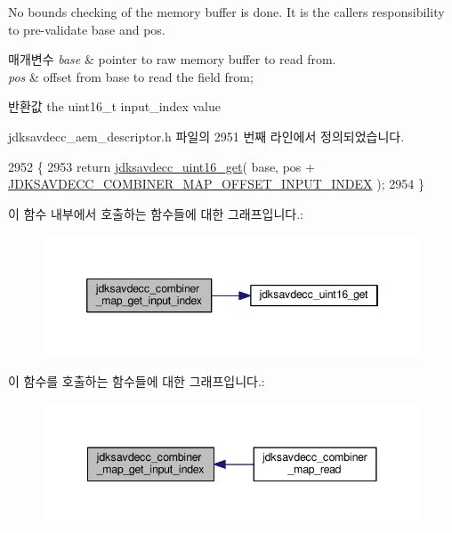 No bounds checking of the memory buffer is done. It is the caller\textquotesingle{}s responsibility to pre-\/validate base and pos.


\begin{DoxyParams}{매개변수}
{\em base} & pointer to raw memory buffer to read from. \\
\hline
{\em pos} & offset from base to read the field from; \\
\hline
\end{DoxyParams}
\begin{DoxyReturn}{반환값}
the uint16\+\_\+t input\+\_\+index value 
\end{DoxyReturn}


jdksavdecc\+\_\+aem\+\_\+descriptor.\+h 파일의 2951 번째 라인에서 정의되었습니다.


\begin{DoxyCode}
2952 \{
2953     \textcolor{keywordflow}{return} \hyperlink{group__endian_ga3fbbbc20be954aa61e039872965b0dc9}{jdksavdecc\_uint16\_get}( base, pos + 
      \hyperlink{group__combiner__map_gad2a9b9293252a0872808741240a44542}{JDKSAVDECC\_COMBINER\_MAP\_OFFSET\_INPUT\_INDEX} );
2954 \}
\end{DoxyCode}


이 함수 내부에서 호출하는 함수들에 대한 그래프입니다.\+:
\nopagebreak
\begin{figure}[H]
\begin{center}
\leavevmode
\includegraphics[width=346pt]{group__combiner__map_ga816da67b1dd4de7c120a82fda698721b_cgraph}
\end{center}
\end{figure}




이 함수를 호출하는 함수들에 대한 그래프입니다.\+:
\nopagebreak
\begin{figure}[H]
\begin{center}
\leavevmode
\includegraphics[width=341pt]{group__combiner__map_ga816da67b1dd4de7c120a82fda698721b_icgraph}
\end{center}
\end{figure}


